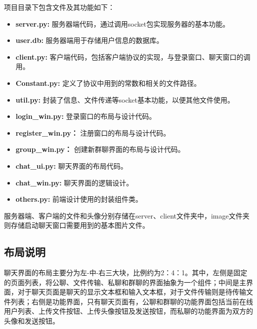 \documentclass[12pt]{article} %
\begin{document}
\begin{sloppypar}
项目目录下包含文件及其功能如下：
\begin{itemize}
	\item {\bf server.py:} 服务器端代码，通过调用socket包实现服务器的基本功能。\vspace*{-1.5mm}
	\item {\bf user.db:} 服务器端用于存储用户信息的数据库。\vspace*{-1.5mm}
	\item {\bf client.py:} 客户端代码，包括客户端协议的实现，与登录窗口、聊天窗口的调用。\vspace*{-1.5mm}
	\item {\bf Constant.py:} 定义了协议中用到的常数和相关的文件路径。\vspace*{-1.5mm}
	\item {\bf util.py:} 封装了信息、文件传递等socket基本功能，以便其他文件使用。\vspace*{-1.5mm}
	\item {\bf login\_win.py:} 登录窗口的布局与设计代码。\vspace*{-1.5mm}
	\item {\bf register\_win.py：} 注册窗口的布局与设计代码。\vspace*{-1.5mm}
	\item {\bf group\_win.py：} 创建新群聊界面的布局与设计代码。\vspace*{-1.5mm}
	\item {\bf chat\_ui.py:} 聊天界面的布局代码。\vspace*{-1.5mm}
	\item {\bf chat\_win.py:} 聊天界面的逻辑设计。\vspace*{-1.5mm}
	\item {\bf others.py:} 前端设计使用的封装组件类。\vspace*{-1.5mm}
\end{itemize}

服务器端、客户端的文件和头像分别存储在server、client文件夹中，image文件夹则存储启动聊天窗口需要用到的基本图片文件。
\subsection{布局说明}

聊天界面的布局主要分为左-中-右三大块，比例约为2：4：1。其中，左侧是固定的页面列表，将公聊、文件传输、私聊和群聊的界面抽象为一个组件；中间是主界面，对于聊天页面是聊天的显示文本框和输入文本框，对于文件传输则是待传输文件列表；右侧是功能界面，只有聊天页面有，公聊和群聊的功能界面包括当前在线用户列表、上传文件按钮、上传头像按钮及发送按钮，而私聊的功能界面为双方的头像和发送按钮。


\end{sloppypar}
\end{document}
